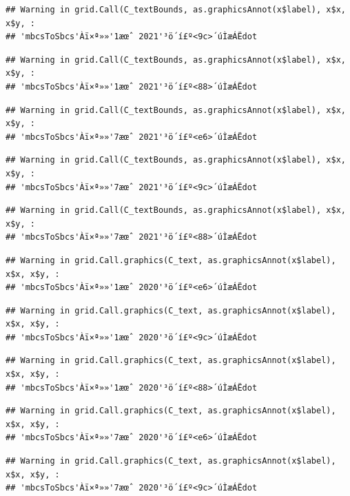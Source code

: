 \documentclass[
]{book}
\begin{document}
\begin{verbatim}
## Warning in grid.Call(C_textBounds, as.graphicsAnnot(x$label), x$x, x$y, :
## 'mbcsToSbcs'Àï×ª»»'1æœˆ 2021'³ö´í£º<9c>´úÌæÁËdot
\end{verbatim}

\begin{verbatim}
## Warning in grid.Call(C_textBounds, as.graphicsAnnot(x$label), x$x, x$y, :
## 'mbcsToSbcs'Àï×ª»»'1æœˆ 2021'³ö´í£º<88>´úÌæÁËdot
\end{verbatim}

\begin{verbatim}
## Warning in grid.Call(C_textBounds, as.graphicsAnnot(x$label), x$x, x$y, :
## 'mbcsToSbcs'Àï×ª»»'7æœˆ 2021'³ö´í£º<e6>´úÌæÁËdot
\end{verbatim}

\begin{verbatim}
## Warning in grid.Call(C_textBounds, as.graphicsAnnot(x$label), x$x, x$y, :
## 'mbcsToSbcs'Àï×ª»»'7æœˆ 2021'³ö´í£º<9c>´úÌæÁËdot
\end{verbatim}

\begin{verbatim}
## Warning in grid.Call(C_textBounds, as.graphicsAnnot(x$label), x$x, x$y, :
## 'mbcsToSbcs'Àï×ª»»'7æœˆ 2021'³ö´í£º<88>´úÌæÁËdot
\end{verbatim}

\begin{verbatim}
## Warning in grid.Call.graphics(C_text, as.graphicsAnnot(x$label), x$x, x$y, :
## 'mbcsToSbcs'Àï×ª»»'1æœˆ 2020'³ö´í£º<e6>´úÌæÁËdot
\end{verbatim}

\begin{verbatim}
## Warning in grid.Call.graphics(C_text, as.graphicsAnnot(x$label), x$x, x$y, :
## 'mbcsToSbcs'Àï×ª»»'1æœˆ 2020'³ö´í£º<9c>´úÌæÁËdot
\end{verbatim}

\begin{verbatim}
## Warning in grid.Call.graphics(C_text, as.graphicsAnnot(x$label), x$x, x$y, :
## 'mbcsToSbcs'Àï×ª»»'1æœˆ 2020'³ö´í£º<88>´úÌæÁËdot
\end{verbatim}

\begin{verbatim}
## Warning in grid.Call.graphics(C_text, as.graphicsAnnot(x$label), x$x, x$y, :
## 'mbcsToSbcs'Àï×ª»»'7æœˆ 2020'³ö´í£º<e6>´úÌæÁËdot
\end{verbatim}

\begin{verbatim}
## Warning in grid.Call.graphics(C_text, as.graphicsAnnot(x$label), x$x, x$y, :
## 'mbcsToSbcs'Àï×ª»»'7æœˆ 2020'³ö´í£º<9c>´úÌæÁËdot
\end{verbatim}
\end{document}
